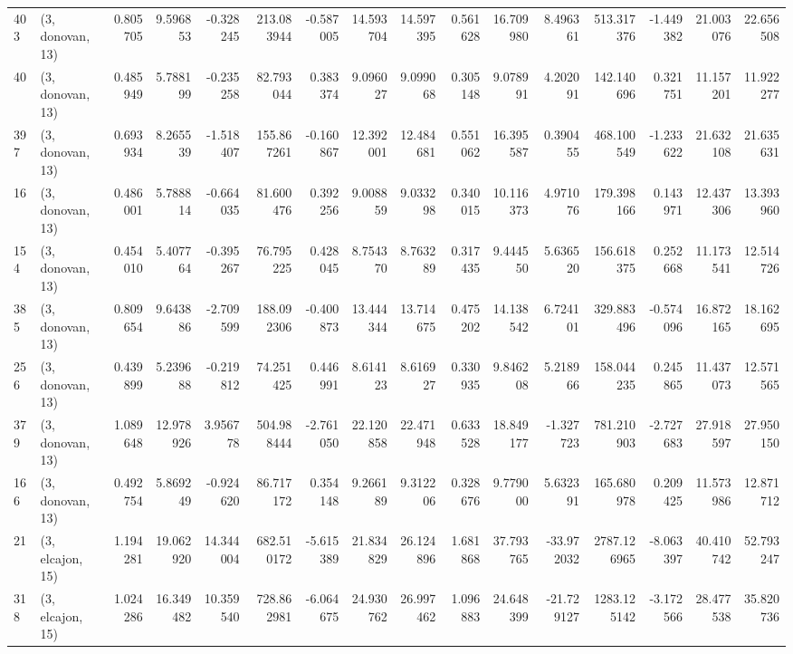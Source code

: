 \begin{tabular}{llrrrrrrrrrrrrrr}
403 &  (3, donovan, 13) &   0.805705 &   9.596853 &  -0.328245 &   213.083944 &  -0.587005 &  14.593704 &  14.597395 &  0.561628 &  16.709980 &   8.496361 &    513.317376 &   -1.449382 &   21.003076 &   22.656508 \\
40  &  (3, donovan, 13) &   0.485949 &   5.788199 &  -0.235258 &    82.793044 &   0.383374 &   9.096027 &   9.099068 &  0.305148 &   9.078991 &   4.202091 &    142.140696 &    0.321751 &   11.157201 &   11.922277 \\
397 &  (3, donovan, 13) &   0.693934 &   8.265539 &  -1.518407 &   155.867261 &  -0.160867 &  12.392001 &  12.484681 &  0.551062 &  16.395587 &   0.390455 &    468.100549 &   -1.233622 &   21.632108 &   21.635631 \\
16  &  (3, donovan, 13) &   0.486001 &   5.788814 &  -0.664035 &    81.600476 &   0.392256 &   9.008859 &   9.033298 &  0.340015 &  10.116373 &   4.971076 &    179.398166 &    0.143971 &   12.437306 &   13.393960 \\
154 &  (3, donovan, 13) &   0.454010 &   5.407764 &  -0.395267 &    76.795225 &   0.428045 &   8.754370 &   8.763289 &  0.317435 &   9.444550 &   5.636520 &    156.618375 &    0.252668 &   11.173541 &   12.514726 \\
385 &  (3, donovan, 13) &   0.809654 &   9.643886 &  -2.709599 &   188.092306 &  -0.400873 &  13.444344 &  13.714675 &  0.475202 &  14.138542 &   6.724101 &    329.883496 &   -0.574096 &   16.872165 &   18.162695 \\
256 &  (3, donovan, 13) &   0.439899 &   5.239688 &  -0.219812 &    74.251425 &   0.446991 &   8.614123 &   8.616927 &  0.330935 &   9.846208 &   5.218966 &    158.044235 &    0.245865 &   11.437073 &   12.571565 \\
379 &  (3, donovan, 13) &   1.089648 &  12.978926 &   3.956778 &   504.988444 &  -2.761050 &  22.120858 &  22.471948 &  0.633528 &  18.849177 &  -1.327723 &    781.210903 &   -2.727683 &   27.918597 &   27.950150 \\
166 &  (3, donovan, 13) &   0.492754 &   5.869249 &  -0.924620 &    86.717172 &   0.354148 &   9.266189 &   9.312206 &  0.328676 &   9.779000 &   5.632391 &    165.680978 &    0.209425 &   11.573986 &   12.871712 \\
21  &  (3, elcajon, 15) &   1.194281 &  19.062920 &  14.344004 &   682.510172 &  -5.615389 &  21.834829 &  26.124896 &  1.681868 &  37.793765 & -33.972032 &   2787.126965 &   -8.063397 &   40.410742 &   52.793247 \\
318 &  (3, elcajon, 15) &   1.024286 &  16.349482 &  10.359540 &   728.862981 &  -6.064675 &  24.930762 &  26.997462 &  1.096883 &  24.648399 & -21.729127 &   1283.125142 &   -3.172566 &   28.477538 &   35.820736 \\

\end{tabular}
